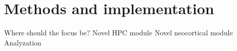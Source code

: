 
\chapter{Methods and implementation}\label{chpt:methods}
Where should the focus be?
Novel HPC module
Novel neocortical module
Analyzation


\cleardoublepage